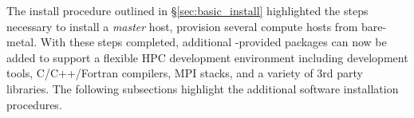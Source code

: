 The install procedure outlined in \S\ref{sec:basic_install} highlighted the
steps necessary to install a {\em master} host, provision several compute hosts from bare-metal\iftoggle{isstateful}{ and customize their install}{}. With
these steps completed, additional \OHPC{}-provided packages can now be added to
support a flexible HPC development environment including development tools,
C/C++/Fortran compilers, MPI stacks, and a variety of 3rd party libraries. The
following subsections highlight the additional software installation
procedures.


